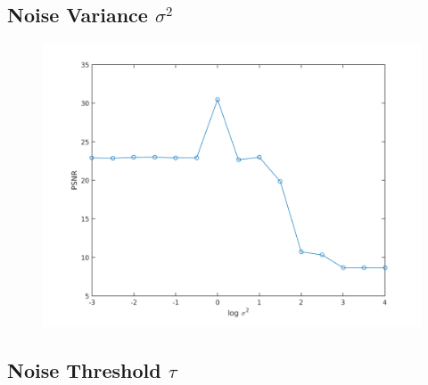 \subsection{Noise Variance \texorpdfstring{$\sigma^2$}{[sigma2]}}

\begin{figure}
\includegraphics[width=\textwidth]{Chapter7/Images/noise_lenna_wide.png}
\end{figure}


\subsection{Noise Threshold \texorpdfstring{$\tau$}{[tau]}}

